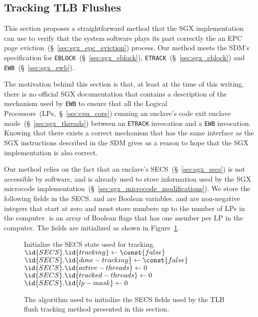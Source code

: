 \subsection{Tracking TLB Flushes}
\label{sec:sgx_ewb_guess}

This section proposes a straightforward method that the SGX implementation can
use to verify that the system software plays its part correctly the an EPC page
eviction~(\S~\ref{sec:sgx_epc_eviction}) process. Our method meets the SDM's
specification for \texttt{EBLOCK}~(\S~\ref{sec:sgx_eblock}),
\texttt{ETRACK}~(\S~\ref{sec:sgx_eblock}) and
\texttt{EWB}~(\S~\ref{sec:sgx_ewb}).

The motivation behind this section is that, at least at the time of this
writing, there is no official SGX documentation that contains a description of
the mechanism used by \texttt{EWB} to ensure that all the Logical
Processors~(LPs,~\S~\ref{sec:cpu_core}) running an enclave's code exit enclave
mode~(\S~\ref{sec:sgx_threads}) between an \texttt{ETRACK} invocation and a
\texttt{EWB} invocation. Knowing that there exists a correct mechanism that has
the same interface as the SGX instructions described in the SDM gives us a
reason to hope that the SGX implementation is also correct.

Our method relies on the fact that an enclave's SECS~(\S~\ref{sec:sgx_secs}) is
not accessible by software, and is already used to store information used by
the SGX microcode implementation~(\S~\ref{sec:sgx_microcode_modifications}).
We store the following fields in the SECS.  and
 are Boolean variables.  and
 are non-negative integers that start at zero and must store
numbers up to the number of LPs in the computer.  is an array of
Boolean flags that has one member per LP in the computer. The fields are
initialized as shown in Figure~\ref{fig:sgx_tracking_ecreate}.

\begin{figure}[hbt]
  \begin{codebox}
  \zi \Comment Initialize the SECS state used for tracking.
  \li $\id{SECS}.\id{tracking} \gets \const{false}$
  \li $\id{SECS}.\id{done-tracking} \gets \const{false}$
  \li $\id{SECS}.\id{active-threads} \gets 0$
  \li $\id{SECS}.\id{tracked-threads} \gets 0$
  \li $\id{SECS}.\id{lp-mask} \gets 0$
  \end{codebox}
  \caption{
    The algorithm used to initialize the SECS fields used by the TLB flush
    tracking method presented in this section.
  }
  \label{fig:sgx_tracking_ecreate}
\end{figure}


